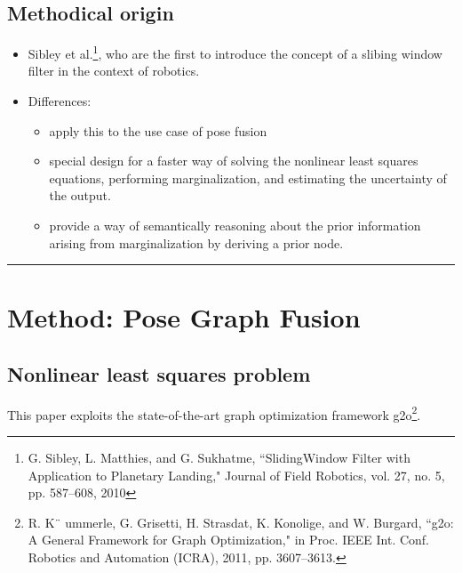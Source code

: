 \documentclass[letterpaper,10pt]{article}
\begin{document}
\subsection{Methodical origin}

\begin{itemize}
	\item Sibley et al.\footnote{G. Sibley, L. Matthies, and G. Sukhatme, ``SlidingWindow Filter with Application to Planetary Landing," Journal of Field Robotics, vol. 27, no. 5, pp. 587–608, 2010}, who are the first to introduce the concept of a slibing window filter in the context of robotics.
	\item Differences:
	\begin{itemize}
		\item apply this to the use case of pose fusion
		\item special design for a faster way of solving the nonlinear least squares equations, performing marginalization, and estimating the uncertainty of the output.
		\item provide a way of semantically reasoning about the prior information arising from marginalization by deriving a prior node.
	\end{itemize}
\end{itemize}

\begin{center}\rule{\textwidth}{1pt}\end{center}
\section{Method: Pose Graph Fusion}

\subsection{Nonlinear least squares problem}

This paper exploits the state-of-the-art graph optimization framework g2o\footnote{R. K¨ ummerle, G. Grisetti, H. Strasdat, K. Konolige, and W. Burgard, ``g2o: A General Framework for Graph Optimization," in Proc. IEEE Int. Conf. Robotics and Automation (ICRA), 2011, pp. 3607–3613.}.
\end{document}
